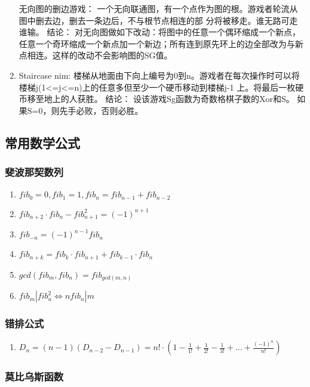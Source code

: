 \documentclass[landscape,a4paper]{article}
\begin{document}
\begin{spacing}{0.3}
\begin{multicols}{2}
\begin{enumerate}
		无向图的删边游戏：
		一个无向联通图，有一个点作为图的根。游戏者轮流从图中删去边，删去一条边后，不与根节点相连的部 分将被移走。谁无路可走谁输。
		结论：
		对无向图做如下改动：将图中的任意一个偶环缩成一个新点，任意一个奇环缩成一个新点加一个新边；所有连到原先环上的边全部改为与新点相连。这样的改动不会影响图的SG值。
	\item Staircase nim:
		楼梯从地面由下向上编号为0到n。游戏者在每次操作时可以将楼梯j(1<=j<=n)上的任意多但至少一个硬币移动到楼梯j-1 上。将最后一枚硬币移至地上的人获胜。
		结论：
		设该游戏Sg函数为奇数格棋子数的Xor和S。
		如果S=0，则先手必败，否则必胜。
\end{enumerate}
\subsection{常用数学公式}
\subsubsection{斐波那契数列}

\begin{enumerate}
	\item $fib_0=0, fib_1=1, fib_n=fib_{n-1}+fib_{n-2}$
	\item $fib_{n+2} \cdot fib_n-fib_{n+1}^2=(-1)^{n+1}$
	\item $fib_{-n}=(-1)^{n-1}fib_n$
	\item $fib_{n+k}=fib_k \cdot fib_{n+1}+fib_{k-1} \cdot fib_n$
	\item $gcd(fib_m, fib_n)=fib_{gcd(m, n)}$
	\item $fib_m|fib_n^2\Leftrightarrow nfib_n|m$
\end{enumerate}

\subsubsection{错排公式}

\begin{enumerate}
	\item $D_n = (n-1)(D_{n-2}-D_{n-1})
	= n! \cdot (1-\frac{1}{1!}+\frac{1}{2!}-\frac{1}{3!}+\ldots+\frac{(-1)^n}{n!})$
\end{enumerate}

\subsubsection{莫比乌斯函数}


\end{multicols}
\end{spacing}
\end{document}
